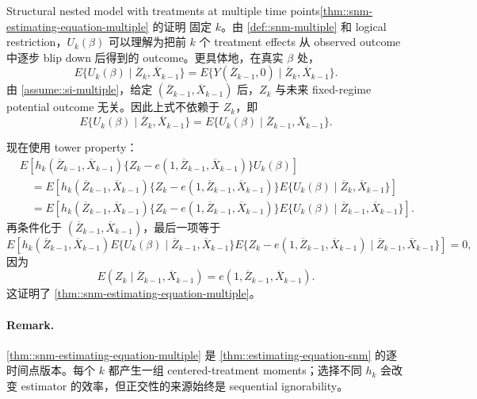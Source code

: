 \begin{exercisesolution}{Structural nested model with treatments at multiple time points}{\cref{thm::snm-estimating-equation-multiple} 的证明}
固定 $k$。由 \cref{def::snm-multiple} 和 logical restriction，$U_k(\beta)$ 可以理解为把前 $k$ 个 treatment effects 从 observed outcome 中逐步 blip down 后得到的 outcome。更具体地，在真实 $\beta$ 处，
\[
E\{U_k(\beta)\mid \overline Z_k,\overline X_{k-1}\}
=
E\{Y(\overline Z_{k-1},0)\mid \overline Z_k,\overline X_{k-1}\}.
\]
由 \cref{assume::si-multiple}，给定 $(\overline Z_{k-1},\overline X_{k-1})$ 后，$Z_k$ 与未来 fixed-regime potential outcome 无关。因此上式不依赖于 $Z_k$，即
\[
E\{U_k(\beta)\mid \overline Z_k,\overline X_{k-1}\}
=
E\{U_k(\beta)\mid \overline Z_{k-1},\overline X_{k-1}\}.
\]

现在使用 tower property：
\begin{align*}
&E\left[
h_k(\overline Z_{k-1},\overline X_{k-1})
\{Z_k-e(1,\overline Z_{k-1},\overline X_{k-1})\}
U_k(\beta)
\right]\\
&\quad =
E\left[
h_k(\overline Z_{k-1},\overline X_{k-1})
\{Z_k-e(1,\overline Z_{k-1},\overline X_{k-1})\}
E\{U_k(\beta)\mid \overline Z_k,\overline X_{k-1}\}
\right]\\
&\quad =
E\left[
h_k(\overline Z_{k-1},\overline X_{k-1})
\{Z_k-e(1,\overline Z_{k-1},\overline X_{k-1})\}
E\{U_k(\beta)\mid \overline Z_{k-1},\overline X_{k-1}\}
\right].
\end{align*}
再条件化于 $(\overline Z_{k-1},\overline X_{k-1})$，最后一项等于
\[
E\left[
h_k(\overline Z_{k-1},\overline X_{k-1})
E\{U_k(\beta)\mid \overline Z_{k-1},\overline X_{k-1}\}
E\{Z_k-e(1,\overline Z_{k-1},\overline X_{k-1})
\mid \overline Z_{k-1},\overline X_{k-1}\}
\right]=0,
\]
因为
\[
E(Z_k\mid \overline Z_{k-1},\overline X_{k-1})
=e(1,\overline Z_{k-1},\overline X_{k-1}).
\]
这证明了 \cref{thm::snm-estimating-equation-multiple}。

\paragraph{Remark.}
\cref{thm::snm-estimating-equation-multiple} 是 \cref{thm::estimating-equation-snm} 的逐时间点版本。每个 $k$ 都产生一组 centered-treatment moments；选择不同 $h_k$ 会改变 estimator 的效率，但正交性的来源始终是 sequential ignorability。
\end{exercisesolution}
